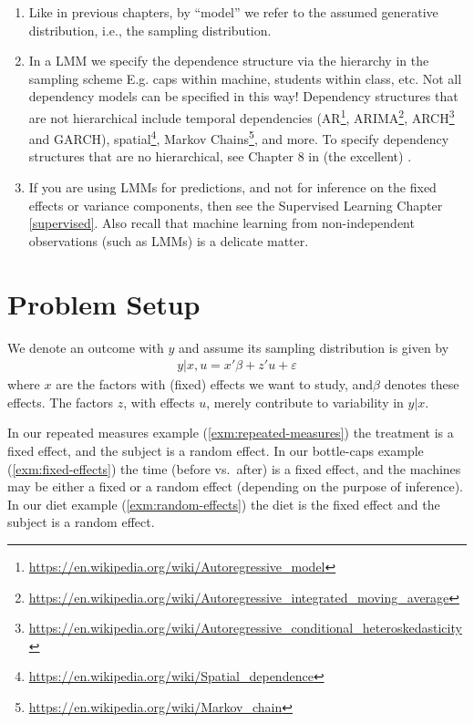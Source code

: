 \documentclass[]{book}
\renewcommand{\href}[2]{#2\footnote{\url{#1}}}
\theoremstyle{definition}
\theoremstyle{definition}
\theoremstyle{definition}
\theoremstyle{remark}
\begin{document}
\begin{enumerate}
\def\labelenumi{\arabic{enumi}.}
\item
  Like in previous chapters, by ``model'' we refer to the assumed generative distribution, i.e., the sampling distribution.
\item
  In a LMM we specify the dependence structure via the hierarchy in the sampling scheme E.g. caps within machine, students within class, etc.
  Not all dependency models can be specified in this way!
  Dependency structures that are not hierarchical include temporal dependencies (\href{https://en.wikipedia.org/wiki/Autoregressive_model}{AR}, \href{https://en.wikipedia.org/wiki/Autoregressive_integrated_moving_average}{ARIMA}, \href{https://en.wikipedia.org/wiki/Autoregressive_conditional_heteroskedasticity}{ARCH} and GARCH), \href{https://en.wikipedia.org/wiki/Spatial_dependence}{spatial}, \href{https://en.wikipedia.org/wiki/Markov_chain}{Markov Chains}, and more.
  To specify dependency structures that are no hierarchical, see Chapter 8 in (the excellent) \citet{weiss2005modeling}.
\item
  If you are using LMMs for predictions, and not for inference on the fixed effects or variance components, then see the Supervised Learning Chapter \ref{supervised}.
  Also recall that machine learning from non-independent observations (such as LMMs) is a delicate matter.
\end{enumerate}

\hypertarget{problem-setup-2}{%
\section{Problem Setup}\label{problem-setup-2}}

We denote an outcome with \(y\) and assume its sampling distribution is given by
\begin{align}
  y|x,u = x'\beta + z'u + \varepsilon
  \label{eq:mixed-model}  
\end{align}
where \(x\) are the factors with (fixed) effects we want to study, and\(\beta\) denotes these effects.
The factors \(z\), with effects \(u\), merely contribute to variability in \(y|x\).

In our repeated measures example (\ref{exm:repeated-measures}) the treatment is a fixed effect, and the subject is a random effect.
In our bottle-caps example (\ref{exm:fixed-effects}) the time (before vs.~after) is a fixed effect, and the machines may be either a fixed or a random effect (depending on the purpose of inference).
In our diet example (\ref{exm:random-effects}) the diet is the fixed effect and the subject is a random effect.
\end{document}
